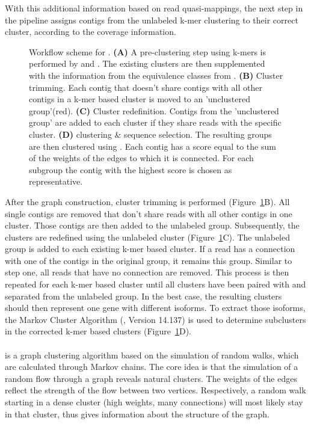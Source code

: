 \documentclass[12pt,a4paper,english]{article}
\begin{document}
	\noindent
	With this additional information based on read quasi-mappings, the next step in the pipeline assigns contigs from the unlabeled k-mer clustering to their correct cluster, according to the coverage information.
	
	\begin{figure}[H]
		\centering
		\def\svgwidth{\textwidth}
		
		\caption[Workflow scheme of \karma.]{\label{img:karma_workflow} Workflow scheme for \karma. \textbf{(A)} A pre-clustering step using k-mers is performed by \umap and \hdbscan. The existing clusters are then supplemented with the information from the equivalence classes from \salmon.
			\textbf{(B)} Cluster trimming. Each contig that doesn't share contigs with all other contigs in a k-mer based cluster is moved to an 'unclustered group'(red).
			\textbf{(C)} Cluster redefinition. Contigs from the 'unclustered group' are added to each cluster if they share reads with the specific cluster.
			\textbf{(D)} \mcl clustering \& sequence selection. The resulting groups are then clustered using \mcl. Each contig has a score equal to the sum of the weights of the edges to which it is connected. For each subgroup the contig with the highest score is chosen as representative.}
	\end{figure} 
	
    After the graph construction, cluster trimming is performed (Figure~\ref{img:karma_workflow}B). All single contigs are removed that don't share reads with all other contigs in one cluster. Those contigs are then added to the unlabeled group.
	Subsequently, the clusters are redefined using the unlabeled cluster (Figure~\ref{img:karma_workflow}C). The unlabeled group is added to each existing k-mer based cluster. If a read has a connection with one of the contigs in the original group, it remains this group. Similar to step one, all reads that have no connection are removed. This process is then repeated for each k-mer based cluster until all clusters have been paired with and separated from the unlabeled group.
	In the best case, the resulting clusters should then represent one gene with different isoforms. To extract those isoforms, the Markov Cluster Algorithm (\mcl, Version 14.137) \citep{mcl:00} is used to determine subclusters in the corrected k-mer based clusters (Figure~\ref{img:karma_workflow}D).\\
	\\
	\mcl is a graph clustering algorithm based on the simulation of random walks, which are calculated through Markov chains. The core idea is that the simulation of a random flow through a graph reveals natural clusters. The weights of the edges reflect the strength of the flow between two vertices. Respectively, a random walk starting in a dense cluster (high weights, many connections) will most likely stay in that cluster, thus gives information about the structure of the graph.
	
\end{document}
